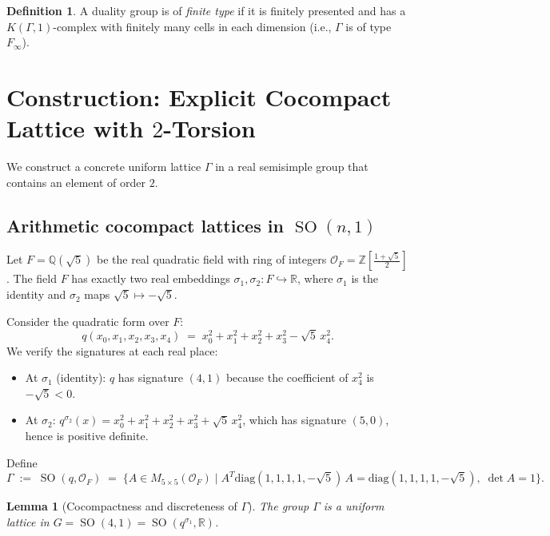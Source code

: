 \documentclass[12pt]{article}
\newtheorem{lemma}[theorem]{Lemma}
\theoremstyle{definition}
\newtheorem{definition}[theorem]{Definition}
\DeclareMathOperator{\SO}{SO}
\begin{document}
\begin{definition}
A duality group is of \emph{finite type} if it is finitely presented and has a
$K(\Gamma,1)$-complex with finitely many cells in each dimension (i.e., $\Gamma$ is of
type $F_\infty$).
\end{definition}

\section{Construction: Explicit Cocompact Lattice with $2$-Torsion}

We construct a concrete uniform lattice $\Gamma$ in a real semisimple group that contains
an element of order $2$.

\subsection{Arithmetic cocompact lattices in $\SO(n,1)$}

Let $F = \mathbb{Q}(\sqrt{5})$ be the real quadratic field with ring of integers
$\mathcal{O}_F = \mathbb{Z}[\frac{1+\sqrt{5}}{2}]$.  The field $F$ has exactly two real
embeddings $\sigma_1, \sigma_2\colon F \hookrightarrow \mathbb{R}$, where $\sigma_1$ is
the identity and $\sigma_2$ maps $\sqrt{5} \mapsto -\sqrt{5}$.

Consider the quadratic form over $F$:
\begin{equation}\label{eq:form}
  q(x_0, x_1, x_2, x_3, x_4) \;=\;
  x_0^2 + x_1^2 + x_2^2 + x_3^2 - \sqrt{5}\,x_4^2.
\end{equation}
We verify the signatures at each real place:
\begin{itemize}
  \item At $\sigma_1$ (identity): $q$ has signature $(4,1)$ because the coefficient of
    $x_4^2$ is $-\sqrt{5} < 0$.
  \item At $\sigma_2$: $q^{\sigma_2}(x) = x_0^2 + x_1^2 + x_2^2 + x_3^2 + \sqrt{5}\,x_4^2$,
    which has signature $(5,0)$, hence is positive definite.
\end{itemize}
Define
\[
  \Gamma \;:=\; \SO(q, \mathcal{O}_F) \;=\;
  \bigl\{ A \in M_{5\times 5}(\mathcal{O}_F) \;\big|\;
    A^T \mathrm{diag}(1,1,1,1,-\sqrt{5})\, A
    = \mathrm{diag}(1,1,1,1,-\sqrt{5}),\;\det A = 1 \bigr\}.
\]

\begin{lemma}[Cocompactness and discreteness of $\Gamma$]\label{lem:cocompact}
  The group $\Gamma$ is a uniform lattice in $G = \SO(4,1) = \SO(q^{\sigma_1},\mathbb{R})$.
\end{lemma}
\end{document}
